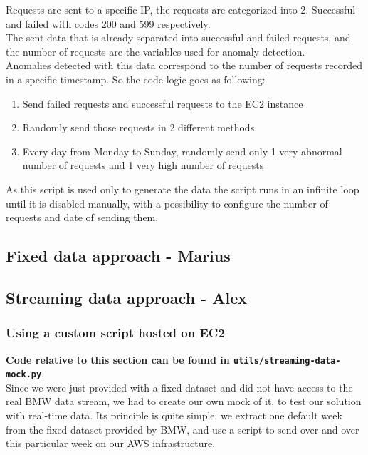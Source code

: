         Requests are sent to a specific IP, the requests are categorized into 2. Successful and failed with codes 200 and 599 respectively.\\
        The sent data that is already separated into successful and failed requests, and the number of requests are the variables used for anomaly detection.\\
        Anomalies detected with this data correspond to the number of requests recorded in a specific timestamp. So the code logic goes as following:
        \begin{enumerate}
    \item Send failed requests and successful requests to the EC2 instance
    \item Randomly send those requests in 2 different methods
    \item Every day from Monday to Sunday, randomly send only 1 very abnormal number of requests and 1 very high number of requests
\end{enumerate}
  
        As this script is used only to generate the data the script runs in an infinite loop until it is disabled manually, with a possibility to configure the number of requests and date of sending them.\\


\subsection{Fixed data approach - Marius}
    
    
\subsection{Streaming data approach - Alex}

    \subsubsection{Using a custom script hosted on EC2} \label{ec2script}
    \textbf{Code relative to this section can be found in \lstinline{utils/streaming-data-mock.py}}. \\
    Since we were just provided with a fixed dataset and did not have access to the real BMW data stream, we had to create our own mock of it, to test our solution with real-time data. Its principle is quite simple: we extract one default week from the fixed dataset provided by BMW, and use a script to send over and over this particular week on our AWS infrastructure. \par
    
